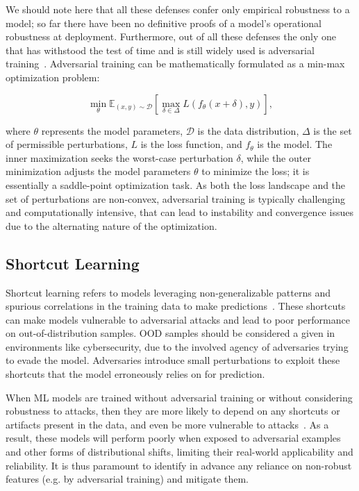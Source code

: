 We should note here that all these defenses confer only empirical robustness to a model; so far there have been no definitive proofs of a model's operational robustness at deployment.
Furthermore, out of all these defenses the only one that has withstood the test of time and is still widely used is adversarial training~\cite{tramer2020adaptive}.
Adversarial training can be mathematically formulated as a min-max optimization problem:

\begin{equation}
\min_{\theta} \mathbb{E}_{(x,y) \sim \mathcal{D}} \left[ \max_{\delta \in \Delta} L(f_\theta(x + \delta), y) \right],
\end{equation}

where \( \theta \) represents the model parameters, \( \mathcal{D} \) is the data distribution, \( \Delta \) is the set of permissible perturbations, \( L \) is the loss function, and \( f_\theta \) is the model.
The inner maximization seeks the worst-case perturbation \( \delta \), while the outer minimization adjusts the model parameters \( \theta \) to minimize the loss; it is essentially a saddle-point optimization task.
As both the loss landscape and the set of perturbations are non-convex, adversarial training is typically challenging and computationally intensive, that can lead to instability and convergence issues due to the alternating nature of the optimization.

\subsection{Shortcut Learning}

Shortcut learning refers to models leveraging non-generalizable patterns and spurious correlations in the training data to make predictions~\cite{geirhos2020shortcut}.
These shortcuts can make models vulnerable to adversarial attacks and lead to poor performance on out-of-distribution samples.
\gls{OOD} samples should be considered a given in environments like cybersecurity, due to the involved agency of adversaries trying to evade the model.
Adversaries introduce small perturbations to exploit these shortcuts that the model erroneously relies on for prediction.

When \gls{ML} models are trained without adversarial training or without considering robustness to attacks, then they are more likely to depend on any shortcuts or artifacts present in the data, and even be more vulnerable to attacks~\cite{ilyas2019adversarial}.
As a result, these models will perform poorly when exposed to adversarial examples and other forms of distributional shifts, limiting their real-world applicability and reliability.
It is thus paramount to identify in advance any reliance on non-robust features (e.g. by adversarial training) and mitigate them.

